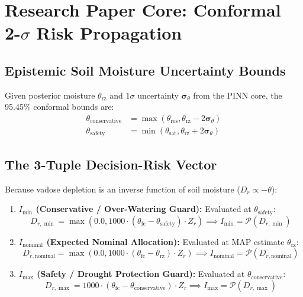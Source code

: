\documentclass[11pt,a4paper]{article}
\theoremstyle{definition}
\theoremstyle{remark}
\begin{document}
\section{Research Paper Core: Conformal 2-$\sigma$ Risk Propagation}

\subsection{Epistemic Soil Moisture Uncertainty Bounds}
Given posterior moisture $\theta_{\text{rz}}$ and $1\sigma$ uncertainty $\boldsymbol{\sigma}_{\theta}$ from the PINN core, the 95.45\% conformal bounds are:
\begin{align}
    \theta_{\text{conservative}} &= \max\left(\theta_{\text{res}}, \theta_{\text{rz}} - 2 \boldsymbol{\sigma}_{\theta}\right) \\
    \theta_{\text{safety}}       &= \min\left(\theta_{\text{sat}}, \theta_{\text{rz}} + 2 \boldsymbol{\sigma}_{\theta}\right)
\end{align}

\subsection{The 3-Tuple Decision-Risk Vector}
Because vadose depletion is an inverse function of soil moisture ($D_r \propto -\theta$):
\begin{enumerate}
    \item \textbf{$I_{\min}$ (Conservative / Over-Watering Guard):} Evaluated at $\theta_{\text{safety}}$:
    \begin{equation}
        D_{r,\min} = \max\left(0.0, 1000 \cdot (\theta_{\text{fc}} - \theta_{\text{safety}}) \cdot Z_r\right) \implies I_{\min} = \mathcal{P}(D_{r,\min})
    \end{equation}
    \item \textbf{$I_{\text{nominal}}$ (Expected Nominal Allocation):} Evaluated at MAP estimate $\theta_{\text{rz}}$:
    \begin{equation}
        D_{r,\text{nominal}} = \max\left(0.0, 1000 \cdot (\theta_{\text{fc}} - \theta_{\text{rz}}) \cdot Z_r\right) \implies I_{\text{nominal}} = \mathcal{P}(D_{r,\text{nominal}})
    \end{equation}
    \item \textbf{$I_{\max}$ (Safety / Drought Protection Guard):} Evaluated at $\theta_{\text{conservative}}$:
    \begin{equation}
        D_{r,\max} = 1000 \cdot (\theta_{\text{fc}} - \theta_{\text{conservative}}) \cdot Z_r \implies I_{\max} = \mathcal{P}(D_{r,\max})
    \end{equation}
\end{enumerate}
\end{document}
